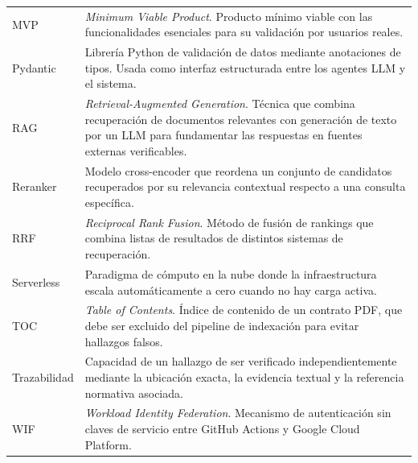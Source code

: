 \begin{longtable}{p{3.5cm} p{9.5cm}}
MVP &
    \textit{Minimum Viable Product}. Producto mínimo viable con las
    funcionalidades esenciales para su validación por usuarios reales. \\[6pt]
Pydantic &
    Librería Python de validación de datos mediante anotaciones de tipos.
    Usada como interfaz estructurada entre los agentes LLM y el sistema. \\[6pt]
RAG &
    \textit{Retrieval-Augmented Generation}. Técnica que combina recuperación
    de documentos relevantes con generación de texto por un LLM para
    fundamentar las respuestas en fuentes externas verificables. \\[6pt]
Reranker &
    Modelo cross-encoder que reordena un conjunto de candidatos recuperados
    por su relevancia contextual respecto a una consulta específica. \\[6pt]
RRF &
    \textit{Reciprocal Rank Fusion}. Método de fusión de rankings que
    combina listas de resultados de distintos sistemas de recuperación. \\[6pt]
Serverless &
    Paradigma de cómputo en la nube donde la infraestructura escala
    automáticamente a cero cuando no hay carga activa. \\[6pt]
TOC &
    \textit{Table of Contents}. Índice de contenido de un contrato PDF,
    que debe ser excluido del pipeline de indexación para evitar hallazgos falsos. \\[6pt]
Trazabilidad &
    Capacidad de un hallazgo de ser verificado independientemente mediante
    la ubicación exacta, la evidencia textual y la referencia normativa asociada. \\[6pt]
WIF &
    \textit{Workload Identity Federation}. Mecanismo de autenticación sin
    claves de servicio entre GitHub Actions y Google Cloud Platform. \\
\end{longtable}
